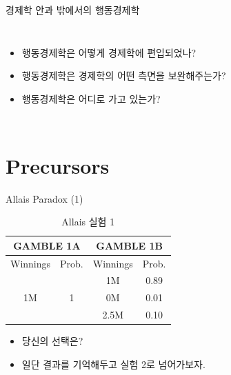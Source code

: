 \documentclass[final]{beamer}
\begin{document}
\begin{frame}[t]{경제학 안과 밖에서의 행동경제학}
	\begin{columns}
		\begin{itemize}
			\item 행동경제학은 어떻게 경제학에 편입되었나?
			\item 행동경제학은 경제학의 어떤 측면을 보완해주는가?
			\item 행동경제학은 어디로 가고 있는가?
		\end{itemize}
	\end{columns}
	
\end{frame}


\section{Precursors} %
\label{sec:precursors}

\begin{frame}[t]{Allais Paradox (1)}
	\begin{table} 
	\setlength{\tabcolsep}{1.2em}
	\begin{tabular}{|c|c||c|c|} \hline
	\multicolumn{2}{|c||}{GAMBLE 1A}&\multicolumn{2}{c|}{GAMBLE 1B} \\ \hline
	Winnings & Prob. & Winnings & Prob. \\ \hline
	\multirow{3}[2]{*}{1M} & \multirow{3}[2]{*}{1} & 1M & 0.89 \\ \cline{3-4}
	& & 0M & 0.01 \\  \cline{3-4}
	& & 2.5M & 0.10 \\  \hline
	\end{tabular}
	\caption{Allais 실험 1}\label{tab:01}
	\end{table}
	\begin{itemize}
		\item 당신의 선택은? 
		\item 일단 결과를 기억해두고 실험 2로 넘어가보자. 
	\end{itemize}
\end{frame}
\end{document}
